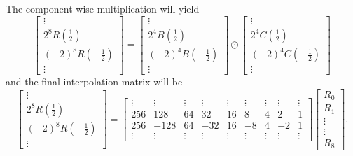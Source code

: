 \documentclass[
11pt,notheorems,hyperref={pdfauthor=whatever}
]{beamer}
\begin{document}
\begin{frame}
    The component-wise multiplication will yield
    \[
    \left[\begin{array}{c}
        \vdots \\
        2^8 R\left(\frac{1}{2}\right) \\
        (-2)^8 R\left(-\frac{1}{2}\right) \\
        \vdots
    \end{array}\right]=
    \left[\begin{array}{c}
        \vdots \\
        2^4B\left(\frac{1}{2}\right) \\
        (-2)^4B\left(-\frac{1}{2}\right) \\
        \vdots
    \end{array}\right]
    \odot
    \left[\begin{array}{c}
            \vdots \\
            2^4C\left(\frac{1}{2}\right) \\
            (-2)^4C\left(-\frac{1}{2}\right) \\
            \vdots
    \end{array}\right]
    \]
    and the final interpolation matrix will be
    $$
    \left[\begin{array}{c}
    \vdots \\
    2^8 R\left(\frac{1}{2}\right) \\
    (-2)^8 R\left(-\frac{1}{2}\right) \\
    \vdots
    \end{array}\right]
    =\left[\begin{array}{ccccccccc} 
    \vdots&\vdots &\vdots &\vdots &\vdots &\vdots &\vdots &\vdots &\vdots \\
    256 &  128 & 64 &  32 &16 &  8 & 4 &  2 & 1 \\
    256 & -128 & 64 & -32 &16 & -8 & 4 & -2 & 1 \\
    \vdots&\vdots &\vdots &\vdots &\vdots & \vdots &\vdots &\vdots &\vdots 
    \end{array}\right]
    \left[\begin{array}{c}
    R_0 \\
    R_1 \\
    \vdots \\
    \vdots \\
    R_8
    \end{array}\right].
    $$
\end{frame}
\end{document}
